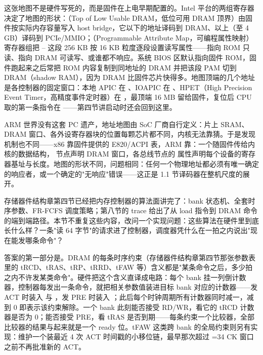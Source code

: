 这张地图不是硬件写死的，而是固件在上电早期配置的。Intel 平台的两组寄存器决定了地图的形状：（Top of Low Usable DRAM，低位可用 DRAM 顶界）由固件按实际内存容量写入 host bridge，它以下的地址译码到 DRAM、以上（至 4 GB）译码到 PCIe/MMIO；（Programmable Attribute Map，可编程属性映射）寄存器组把 -- 这段 256 KB 按 16 KB 粒度逐段设置读写属性——指向 ROM 只读、指向 DRAM 可读写、或谁都不响应。系统 BIOS 区默认指向固件 ROM，固件跑起来之后常把 ROM 内容复制到同地址的 DRAM 并把该段 PAM 切到 DRAM（shadow RAM），因为 DRAM 比固件芯片快得多。地图顶端的几个地址是各控制器的固定窗口：本地 APIC 在 、IOAPIC 在 、HPET（High Precision Event Timer，高精度事件定时器）在 ，最顶端 16 MB 留给固件，复位后 CPU 取的第一条指令在 ——第四节讲启动时还会回到这里。

ARM 世界没有这套 PC 遗产，地址地图由 SoC 厂商自行定义：片上 SRAM、DRAM 窗口、各外设寄存器块的位置每颗芯片都不同，内核无法靠猜。于是发现机制也不同——x86 靠固件提供的 E820/ACPI 表，ARM 靠：一个随固件传给内核的数据结构， 节点声明 DRAM 窗口，各总线节点的  属性声明每个设备的寄存器基址与长度。地图的形状不同，问题相同：任何一个物理地址都必须有唯一确定的响应者，或一个确定的"无响应"错误——这正是 1.1 节译码器在整机尺度的展开。


存储器件结构章第四节已经把内存控制器的算法面讲完了：bank 状态机、全套时序参数、FR-FCFS 调度策略；第八节的 trace 给出了从 load 指令到 DRAM 命令的端到端路径。本节不重复这些内容，改问一个实现问题：这些算法在硬件里到底长什么样？一条"读 64 字节"的请求进了控制器，调度器凭什么在一拍之内说出"现在能发哪条命令"？

答案的第一部分是。DRAM 的每条时序约束（存储器件结构章第四节那张参数表里的 tRCD、tRAS、tRP、tRRD、tFAW 等）含义都是"某条命令之后，多少拍之内不许发某类命令"。硬件把这个含义直译成电路：每个 bank 挂一列倒计数器，控制器每发出一条命令，就把相关参数值装进目标 bank 对应的计数器——发 ACT 时装入  与 ，发 PRE 时装入 ；此后每个时钟周期所有计数器同时减一，减到 0 即表示该约束解除。一个 bank 此刻能否接受 RD/WR，看它的 tRCD 计数器是否为 0；能否接受 PRE，看 tRAS 是否到期——每条约束一个比较器，全部比较器的结果与起来就是一个 ready 位。tFAW 这类跨 bank 的全局约束则另有实现：维护一个装最近 4 次 ACT 时间戳的小移位链，最早那次超过 =34 CK 窗口之前不再批准新的 ACT。

